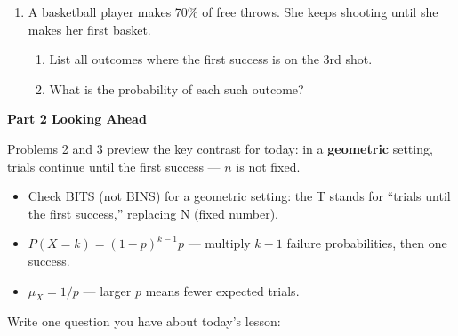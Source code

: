 \documentclass[10pt]{article}
\begin{document}
\begin{enumerate}
    \vspace{0.06in}

    \item A basketball player makes 70\% of free throws. She keeps shooting until
    she makes her first basket.
    \begin{enumerate}[label=(\alph*), itemsep=2pt]
        \item List all outcomes where the first success is on the 3rd shot.\\
        \writeline
        \item What is the probability of each such outcome?\\
        \writeline
    \end{enumerate}

\end{enumerate}

\vspace{0.05in}

{\large\bfseries\color{navy} Part 2 \quad Looking Ahead}

\vspace{0.05in}

\noindent Problems 2 and 3 preview the key contrast for today: in a \textbf{geometric}
setting, trials continue until the first success --- $n$ is not fixed.

\vspace{0.05in}

\begin{tcolorbox}[colback=greenbg, colframe=greenacc, boxrule=0.8pt, arc=2mm,
    left=4mm, right=4mm, top=2mm, bottom=2mm]
    \small
    \begin{itemize}[leftmargin=1.3em, itemsep=2pt]
  \item Check BITS (not BINS) for a geometric setting: the T stands for
        ``trials until the first success,'' replacing N (fixed number).
  \item $P(X = k) = (1-p)^{k-1}p$ --- multiply $k-1$ failure probabilities,
        then one success.
  \item $\mu_X = 1/p$ --- larger $p$ means fewer expected trials.
    \end{itemize}
\end{tcolorbox}

\vspace{0.05in}

\noindent\textcolor{slate}{\small Write one question you have about today's lesson:}\\[2pt]
\writeline\\[2pt]\writeline
\end{document}
